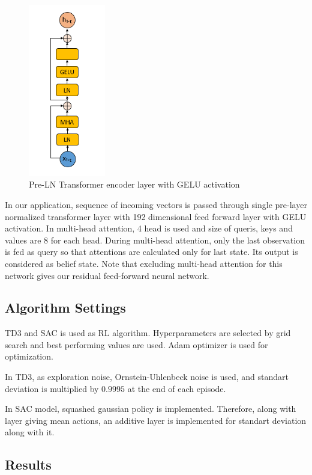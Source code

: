 \documentclass[a4paper, 12pt]{article} %
\begin{document}
\begin{figure}
	\centering
	\includegraphics[width=0.3\textwidth]{figures/ml_theory/transformer_block.png}
	\caption{Pre-LN Transformer encoder layer with GELU activation}
	\label{fig:pre_trsf}
\end{figure}

In our application, sequence of incoming vectors is passed through single pre-layer normalized transformer layer with 192 dimensional feed forward layer with GELU activation. 
In multi-head attention, 4 head is used and size of queris, keys and values are 8 for each head.
During multi-head attention, only the last observation is fed as query so that attentions are calculated only for last state.  
Its output is considered as belief state.
Note that excluding multi-head attention for this network gives our residual feed-forward neural network.

\subsection{Algorithm Settings}
TD3 and SAC is used as RL algorithm. 
Hyperparameters are selected by grid search and best performing values are used. Adam optimizer is used for optimization. 

In TD3, as exploration noise, Ornstein-Uhlenbeck noise is used, and standart deviation is multiplied  by $0.9995$ at the end of each episode. 

In SAC model, squashed gaussian policy is implemented. Therefore, along with layer giving mean actions, an additive layer is implemented for standart deviation along with it. 

\subsection{Results}
\end{document}
